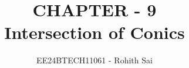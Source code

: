 \documentclass[journal]{IEEEtran}
\begin{document}

\vspace{3cm}

\title{CHAPTER - 9\\Intersection of Conics}
\author{EE24BTECH11061 - Rohith Sai}
{\let\newpage\relax\maketitle}

\renewcommand{\thefigure}{\theenumi}
\renewcommand{\thetable}{\theenumi}
\setlength{\intextsep}{10pt} %

\renewcommand{\thetable}{\theenumi}
\end{document}
